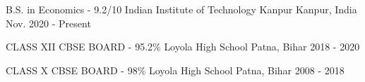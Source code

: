 
\begin{cventries}

  \cventry
    {B.S. in Economics - 9.2/10} %
    {Indian Institute of Technology Kanpur} %
    {Kanpur, India} %
    {Nov. 2020 - Present} %
    { }
    \vspace{-\baselineskip}

    \cventry
    {CLASS XII CBSE BOARD - 95.2\%} %
    {Loyola High School} %
    {Patna, Bihar} %
    {2018 - 2020} %
    { }
    \vspace{-\baselineskip}

    \cventry
    {CLASS X CBSE BOARD - 98\%} %
    {Loyola High School} %
    {Patna, Bihar} %
    {2008 - 2018}  %
    { }
    \vspace{-1.5\baselineskip}

\end{cventries}
